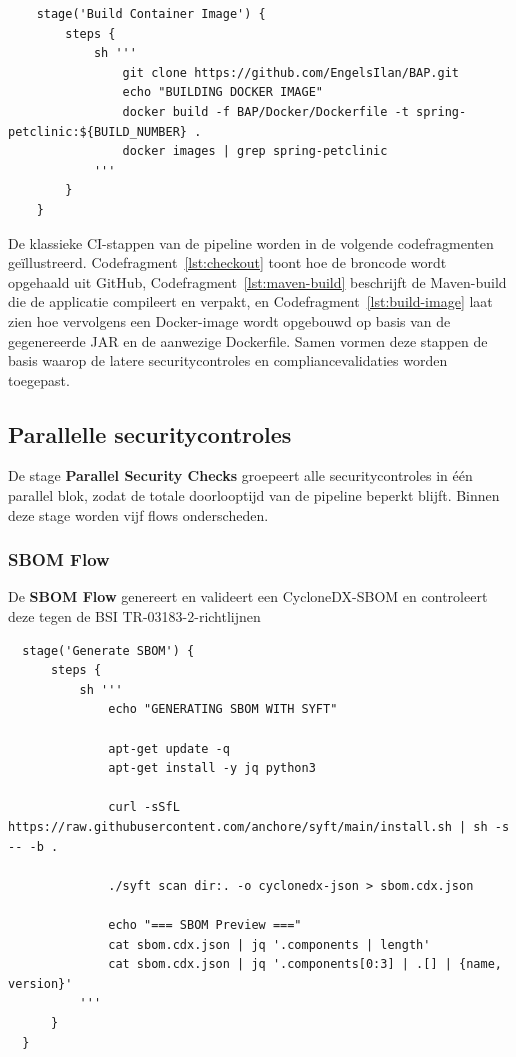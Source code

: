   \begin{listing}[h]
    \caption{Build container image-stage}
    \label{lst:build-image}
    \begin{verbatim}
    stage('Build Container Image') {
        steps {
            sh '''
                git clone https://github.com/EngelsIlan/BAP.git
                echo "BUILDING DOCKER IMAGE"
                docker build -f BAP/Docker/Dockerfile -t spring-petclinic:${BUILD_NUMBER} .
                docker images | grep spring-petclinic
            '''
        }
    }
    \end{verbatim}
  \end{listing}

\FloatBarrier

De klassieke CI-stappen van de pipeline worden in de volgende codefragmenten geïllustreerd. Codefragment~\ref{lst:checkout} toont hoe de broncode wordt opgehaald uit GitHub, Codefragment~\ref{lst:maven-build} beschrijft de Maven-build die de applicatie compileert en verpakt, en Codefragment~\ref{lst:build-image} laat zien hoe vervolgens een Docker-image wordt opgebouwd op basis van de gegenereerde JAR en de aanwezige Dockerfile. Samen vormen deze stappen de basis waarop de latere securitycontroles en compliancevalidaties worden toegepast.

\subsection{Parallelle securitycontroles}

De stage \textbf{Parallel Security Checks} groepeert alle securitycontroles in één parallel blok, zodat de totale doorlooptijd van de pipeline beperkt blijft. Binnen deze stage worden vijf flows onderscheden.
\subsubsection{SBOM Flow}

De \textbf{SBOM Flow} genereert en valideert een CycloneDX-SBOM en controleert deze tegen de BSI TR-03183-2-richtlijnen

\begin{listing}[H]
    \caption{Generate SBOM-stage in Jenkins pipeline}
    \label{lst:sbom-generate}
    \begin{verbatim}
  stage('Generate SBOM') {
      steps {
          sh '''
              echo "GENERATING SBOM WITH SYFT"
  
              apt-get update -q
              apt-get install -y jq python3
  
              curl -sSfL https://raw.githubusercontent.com/anchore/syft/main/install.sh | sh -s -- -b .
  
              ./syft scan dir:. -o cyclonedx-json > sbom.cdx.json
  
              echo "=== SBOM Preview ==="
              cat sbom.cdx.json | jq '.components | length'
              cat sbom.cdx.json | jq '.components[0:3] | .[] | {name, version}'
          '''
      }
  }
    \end{verbatim}
\end{listing}    

